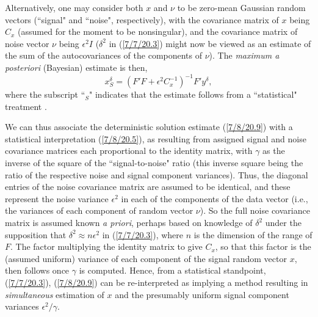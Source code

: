 \documentclass{amsart}
\numberwithin{equation}{section}
\theoremstyle{definition}
\numberwithin{theorem}{section}
\begin{document}
{ Alternatively, one may consider both $x$ and $\nu$ to be zero-mean Gaussian random vectors (``signal" and ``noise", respectively), with the covariance matrix of $x$ being $C_x$ (assumed for the moment to be nonsingular), and the covariance matrix of noise vector $\nu$ being $\epsilon^2 I$ ($\delta^2$ in (\ref{7/7/20.3}) might now be viewed as an estimate of the sum of the autocovariances of the components of $\nu$).  The {\it maximum  a posteriori} (Bayesian) estimate  is then, \begin{equation}\label{7/8/20.5} x^\delta_S = (F'F + \epsilon^2 C_x^{-1})^{-1} F'y^\delta,\end{equation}  where the subscript ``$_S$" indicates that the estimate follows from  a ``statistical" treatment \cite{vogel:2002}. 
  
 We can thus associate the deterministic solution estimate (\ref{7/8/20.9}) with a statistical interpretation (\ref{7/8/20.5}), as resulting from assigned signal and noise covariance matrices each proportional to the identity matrix, with $\gamma$ as the inverse of the square of the  ``signal-to-noise" ratio (this inverse square being the ratio of the respective noise and signal component variances).  Thus, the diagonal entries of the noise covariance matrix are assumed to be identical, and these represent the noise variance $\epsilon^2$ in each of the components of the data vector (i.e., the variances of each component of random vector $\nu$).   So the full noise covariance matrix is assumed known {\it a priori}, perhaps based on knowledge of $\delta^2$ under the supposition that $\delta^2 \approx n\epsilon^2$ in (\ref{7/7/20.3}), where $n$ is the dimension of the range of $F$.  The factor multiplying the identity matrix to give $C_x$, so that this factor is the (assumed uniform) variance of each component of the signal random vector $x$, then follows once $\gamma$ is computed.  Hence, from a statistical standpoint,  (\ref{7/7/20.3}), (\ref{7/8/20.9}) can be re-interpreted as implying a method resulting in {\it simultaneous} estimation of $x$ and the presumably uniform signal component variances $\epsilon^2/\gamma$. 
 
}
\end{document}

